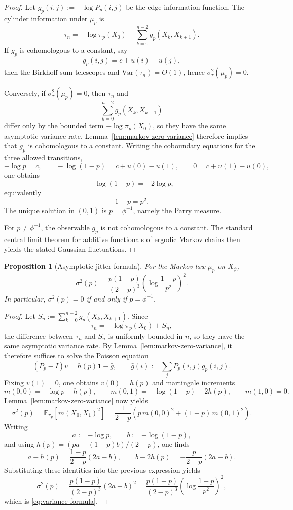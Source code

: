 \documentclass[pdflatex,sn-basic,Numbered]{sn-jnl}
\theoremstyle{thmstyleone}
\newtheorem{proposition}[theorem]{Proposition}
\theoremstyle{thmstyletwo}
\theoremstyle{thmstylethree}
\newcommand{\EE}{\mathbb{E}}
\newcommand{\Var}{\mathrm{Var}}
\begin{document}
\begin{proof}
Let $g_p(i,j):=-\log P_p(i,j)$ be the edge information function. The cylinder information under $\mu_p$ is
\[
\tau_n=-\log \pi_p(X_0)+\sum_{k=0}^{n-2}g_p(X_k,X_{k+1}).
\]
If $g_p$ is cohomologous to a constant, say
\[
g_p(i,j)=c+u(i)-u(j),
\]
then the Birkhoff sum telescopes and $\Var(\tau_n)=O(1)$, hence $\sigma_\tau^2(\mu_p)=0$.

Conversely, if $\sigma_\tau^2(\mu_p)=0$, then $\tau_n$ and
\[
\sum_{k=0}^{n-2}g_p(X_k,X_{k+1})
\]
differ only by the bounded term $-\log\pi_p(X_0)$, so they have the same asymptotic variance rate. Lemma~\ref{lem:markov-zero-variance} therefore implies that $g_p$ is cohomologous to a constant. Writing the coboundary equations for the three allowed transitions,
\[
-\log p=c,\qquad -\log(1-p)=c+u(0)-u(1),\qquad 0=c+u(1)-u(0),
\]
one obtains
\[
-\log(1-p)=-2\log p,
\]
equivalently
\[
1-p=p^2.
\]
The unique solution in $(0,1)$ is $p=\phi^{-1}$, namely the Parry measure.

For $p\neq \phi^{-1}$, the observable $g_p$ is not cohomologous to a constant. The standard central limit theorem for additive functionals of ergodic Markov chains \cite{Gordin1969} then yields the stated Gaussian fluctuations.
\end{proof}

\begin{proposition}[Asymptotic jitter formula]\label{prop:variance-formula}
For the Markov law $\mu_p$ on $X_\phi$,
\begin{equation}\label{eq:variance-formula}
\sigma^2(p)
=
\frac{p(1-p)}{(2-p)^3}
\left(\log\frac{1-p}{p^2}\right)^2.
\end{equation}
In particular, $\sigma^2(p)=0$ if and only if $p=\phi^{-1}$.
\end{proposition}

\begin{proof}
Let $S_n:=\sum_{k=0}^{n-2}g_p(X_k,X_{k+1})$. Since
\[
\tau_n=-\log\pi_p(X_0)+S_n,
\]
the difference between $\tau_n$ and $S_n$ is uniformly bounded in $n$, so they have the same asymptotic variance rate. By Lemma~\ref{lem:markov-zero-variance}, it therefore suffices to solve the Poisson equation
\[
(P_p-I)v=h(p)\mathbf{1}-\bar{g},
\qquad
\bar{g}(i):=\sum_jP_p(i,j)g_p(i,j).
\]
Fixing $v(1)=0$, one obtains $v(0)=h(p)$ and martingale increments
\[
m(0,0)=-\log p-h(p),\qquad
m(0,1)=-\log(1-p)-2h(p),\qquad
m(1,0)=0.
\]
Lemma~\ref{lem:markov-zero-variance} now yields
\[
\sigma^2(p)=\EE_{\pi_p}[m(X_0,X_1)^2]
=
\frac{1}{2-p}\left(p\,m(0,0)^2+(1-p)\,m(0,1)^2\right).
\]
Writing
\[
a:=-\log p,\qquad b:=-\log(1-p),
\]
and using $h(p)=(pa+(1-p)b)/(2-p)$, one finds
\[
a-h(p)=\frac{1-p}{2-p}(2a-b),
\qquad
b-2h(p)=-\frac{p}{2-p}(2a-b).
\]
Substituting these identities into the previous expression yields
\[
\sigma^2(p)
=
\frac{p(1-p)}{(2-p)^3}(2a-b)^2
=
\frac{p(1-p)}{(2-p)^3}\left(\log\frac{1-p}{p^2}\right)^2,
\]
which is \eqref{eq:variance-formula}.
\end{proof}
\end{document}
